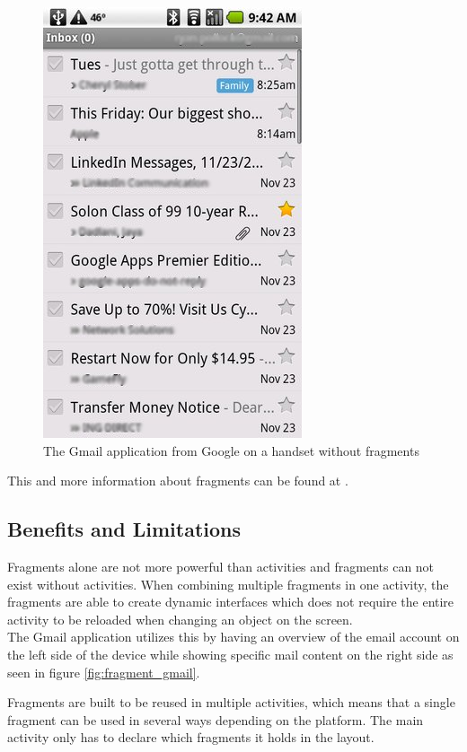 \begin{figure}[htbp]
	\centering
		\includegraphics{Images/Implementation/fragment_gmail_handset.png}
	\caption{The Gmail application from Google on a handset without fragments}
	\label{fig:fragment_gmail_handset}
\end{figure}


This and more information about fragments can be found at \cite{web:android:fragments}.

\subsection{Benefits and Limitations}
Fragments alone are not more powerful than activities and fragments can not exist without activities.
When combining multiple fragments in one activity, the fragments are able to create dynamic interfaces which does not require the entire activity to be reloaded when changing an object on the screen.\\

The Gmail application utilizes this by having an overview of the email account on the left side of the device while showing specific mail content on the right side as seen in figure \ref{fig:fragment_gmail}.

Fragments are built to be reused in multiple activities, which means that a single fragment can be used in several ways depending on the platform.
The main activity only has to declare which fragments it holds in the layout.

